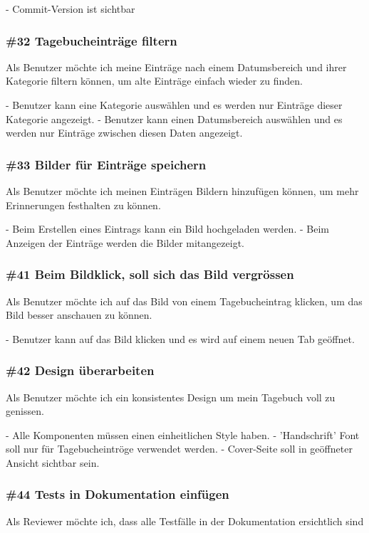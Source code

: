 \noindent
- Commit-Version ist sichtbar


\subsubsection*{\#32 Tagebucheinträge filtern}
Als Benutzer möchte ich meine Einträge nach einem Datumsbereich und ihrer Kategorie filtern können, um alte Einträge einfach wieder zu finden.

\noindent
 - Benutzer kann eine Kategorie auswählen und es werden nur Einträge dieser Kategorie angezeigt.
 - Benutzer kann einen Datumsbereich auswählen und es werden nur Einträge zwischen diesen Daten angezeigt.

 \subsubsection*{\#33 Bilder für Einträge speichern}
 Als Benutzer möchte ich meinen Einträgen Bildern hinzufügen können, um mehr Erinnerungen festhalten zu können.

 \noindent
 - Beim Erstellen eines Eintrags kann ein Bild hochgeladen werden.
 - Beim Anzeigen der Einträge werden die Bilder mitangezeigt.

 \subsubsection*{\#41 Beim Bildklick, soll sich das Bild vergrössen}
 Als Benutzer möchte ich auf das Bild von einem Tagebucheintrag klicken, um das Bild besser anschauen zu können.

 \noindent
 - Benutzer kann auf das Bild klicken und es wird auf einem neuen Tab geöffnet.

 \subsubsection*{\#42 Design überarbeiten}
 Als Benutzer möchte ich ein konsistentes Design um mein Tagebuch voll zu genissen.

 \noindent
 - Alle Komponenten müssen einen einheitlichen Style haben.
 - 'Handschrift' Font soll nur für Tagebucheintröge verwendet werden.
 - Cover-Seite soll in geöffneter Ansicht sichtbar sein.

 \subsubsection*{\#44 Tests in Dokumentation einfügen}
 Als Reviewer möchte ich, dass alle Testfälle in der Dokumentation ersichtlich sind

